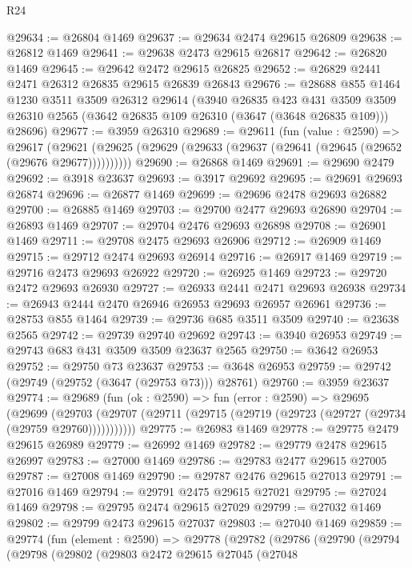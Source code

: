 \begin{lexlean}{R24}
\begin{coremodule}
@29634 := @26804 @1469
@29637 := @29634 @2474 @29615 @26809
@29638 := @26812 @1469
@29641 := @29638 @2473 @29615 @26817
@29642 := @26820 @1469
@29645 := @29642 @2472 @29615 @26825
@29652 := @26829 @2441 @2471 @26312 @26835 @29615 @26839 @26843
@29676 := @28688
    @855
    @1464
    @1230
    @3511
    @3509
    @26312
    @29614
    (@3940
      @26835
      @423
      @431
      @3509
      @3509
      @26310
      @2565
      (@3642 @26835 @109 @26310 (@3647 (@3648 @26835 @109)))
      @28696)
@29677 := @3959 @26310
@29689 := @29611
    (fun (value : @2590) =>
    @29617 (@29621 (@29625 (@29629 (@29633 (@29637 (@29641 (@29645 (@29652 (@29676 @29677))))))))))
@29690 := @26868 @1469
@29691 := @29690 @2479
@29692 := @3918 @23637
@29693 := @3917 @29692
@29695 := @29691 @29693 @26874
@29696 := @26877 @1469
@29699 := @29696 @2478 @29693 @26882
@29700 := @26885 @1469
@29703 := @29700 @2477 @29693 @26890
@29704 := @26893 @1469
@29707 := @29704 @2476 @29693 @26898
@29708 := @26901 @1469
@29711 := @29708 @2475 @29693 @26906
@29712 := @26909 @1469
@29715 := @29712 @2474 @29693 @26914
@29716 := @26917 @1469
@29719 := @29716 @2473 @29693 @26922
@29720 := @26925 @1469
@29723 := @29720 @2472 @29693 @26930
@29727 := @26933 @2441 @2471 @29693 @26938
@29734 := @26943 @2444 @2470 @26946 @26953 @29693 @26957 @26961
@29736 := @28753 @855 @1464
@29739 := @29736 @685 @3511 @3509
@29740 := @23638 @2565
@29742 := @29739 @29740 @29692
@29743 := @3940 @26953
@29749 := @29743 @683 @431 @3509 @3509 @23637 @2565
@29750 := @3642 @26953
@29752 := @29750 @73 @23637
@29753 := @3648 @26953
@29759 := @29742 (@29749 (@29752 (@3647 (@29753 @73))) @28761)
@29760 := @3959 @23637
@29774 := @29689
    (fun (ok : @2590) =>
    fun (error : @2590) =>
    @29695
      (@29699
        (@29703 (@29707 (@29711 (@29715 (@29719 (@29723 (@29727 (@29734 (@29759 @29760)))))))))))
@29775 := @26983 @1469
@29778 := @29775 @2479 @29615 @26989
@29779 := @26992 @1469
@29782 := @29779 @2478 @29615 @26997
@29783 := @27000 @1469
@29786 := @29783 @2477 @29615 @27005
@29787 := @27008 @1469
@29790 := @29787 @2476 @29615 @27013
@29791 := @27016 @1469
@29794 := @29791 @2475 @29615 @27021
@29795 := @27024 @1469
@29798 := @29795 @2474 @29615 @27029
@29799 := @27032 @1469
@29802 := @29799 @2473 @29615 @27037
@29803 := @27040 @1469
@29859 := @29774
    (fun (element : @2590) =>
    @29778
      (@29782
        (@29786
          (@29790
            (@29794
              (@29798
                (@29802
                  (@29803
                    @2472
                    @29615
                    @27045
                    (@27048

\end{coremodule}
\end{lexlean}
